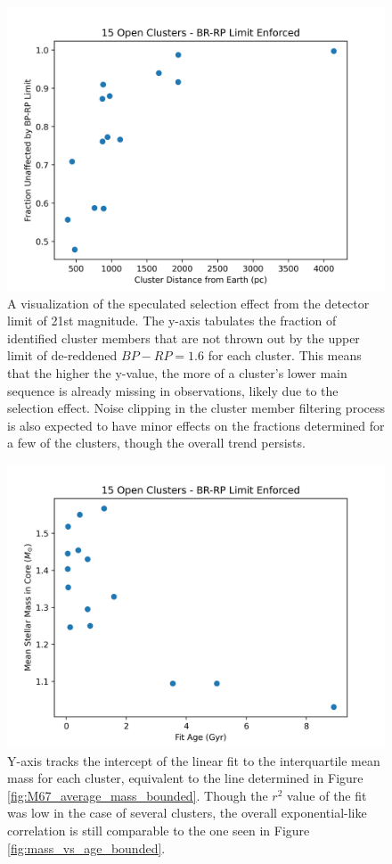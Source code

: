 \documentclass[onecolumn,table,xcdraw,super]{aastex631}
\begin{document}
\begin{figure}[]
    \centering
      \includegraphics[width=4.75in]{figures/bounded_fraction_vs_dist.png}
    \caption{A visualization of the speculated selection effect from the detector limit of 21st magnitude. The y-axis tabulates the fraction of identified cluster members that are not thrown out by the upper limit of de-reddened $BP-RP = 1.6$ for each cluster. This means that the higher the y-value, the more of a cluster's lower main sequence is already missing in observations, likely due to the selection effect. Noise clipping in the cluster member filtering process is also expected to have minor effects on the fractions determined for a few of the clusters, though the overall trend persists.}
    \label{fig:bounded_fraction_vs_dist}
\end{figure}

\begin{figure}[]
    \centering
      \includegraphics[width=4.75in]{figures/mass_intercept_vs_age_bounded.png}
    \caption{Y-axis tracks the intercept of the linear fit to the interquartile mean mass for each cluster, equivalent to the line determined in Figure \ref{fig:M67_average_mass_bounded}. Though the  $r^2$ value of the fit was low in the case of several clusters, the overall exponential-like correlation is still comparable to the one seen in Figure \ref{fig:mass_vs_age_bounded}.}
    \label{fig:mass_intercept_bounded_vs_age}
\end{figure}
\end{document}
